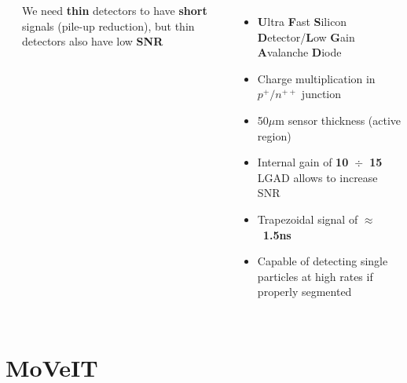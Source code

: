 \documentclass[aspectratio=169]{beamer}
\begin{document}
\begin{frame}
\begin{columns}
\begin{columns}
\begin{center}
			\end{center}
		\begin{center}
			We need \textbf{thin} detectors to have \textbf{short} signals (pile-up reduction), but thin detectors also have low \textbf{SNR}
		\end{center}
	\end{columns}
		\begin{itemize}
			\item \textbf{U}ltra \textbf{F}ast \textbf{S}ilicon \textbf{D}etector/\textbf{L}ow \textbf{G}ain \textbf{A}valanche \textbf{D}iode
			\item Charge multiplication in $p^+ / n^{++}$ junction 
			\item 50$\mu$m sensor thickness (active region)
			\item Internal gain of \textbf{10~$\div$~15}\\
			 	LGAD allows to increase SNR 
			\item Trapezoidal signal of $\approx$~\textbf{1.5ns}
			\item Capable of detecting single particles at high rates if properly segmented
		\end{itemize}
	\end{columns}
	\end{frame}

	\section{MoVeIT}
	
\end{document}
